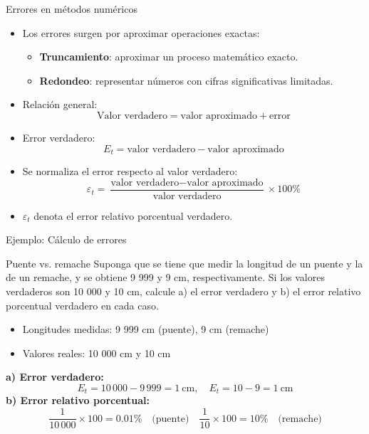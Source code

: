 \documentclass[main.tex]{subfiles}
\begin{document}
\begin{frame}[c]{Errores en métodos numéricos}
\begin{itemize}
  \item Los errores surgen por aproximar operaciones exactas:
  \begin{itemize}
    \item \textbf{Truncamiento}: aproximar un proceso matemático exacto.
    \item \textbf{Redondeo}: representar números con cifras significativas limitadas.
  \end{itemize}
  \item Relación general:
  \[
\boxed{\text{Valor verdadero} = \text{valor aproximado} + \text{error}}
  \]
  \item Error verdadero:
  \[
\boxed{ E_t = \text{valor verdadero} - \text{valor aproximado}}
  \]
\end{itemize}
\begin{itemize}
  \item Se normaliza el error respecto al valor verdadero:
  \[
\boxed{\varepsilon_t = \frac{\text{valor verdadero} - \text{valor aproximado}}{\text{valor verdadero}} \times 100\%}\]
  \item\(\varepsilon_t\) denota el error relativo porcentual verdadero.
\end{itemize}
\end{frame}

\begin{frame}[c]{Ejemplo: Cálculo de errores}
\footnotesize
\begin{block}{Puente vs. remache}
Suponga que se tiene que medir la longitud de un puente y la de
un remache, y se obtiene 9 999 y 9 cm, respectivamente. Si los valores verdaderos son 10 000 y 10 cm, calcule 
a) el error verdadero y b) el error relativo porcentual verdadero en cada caso.
\begin{itemize}
  \item Longitudes medidas: 9 999 cm (puente), 9 cm (remache)
  \item Valores reales: 10 000 cm y 10 cm
\end{itemize}
\textbf{a) Error verdadero:}
\[
E_t = 10\,000 - 9\,999 = 1~\text{cm}, \quad E_t = 10 - 9 = 1~\text{cm}
\]
\textbf{b) Error relativo porcentual:}
\[
\frac{1}{10\,000} \times 100 = 0.01\% \quad \text{(puente)}
\quad \frac{1}{10} \times 100 = 10\% \quad \text{(remache)}
\]
\end{block}
\end{frame}
\end{document}
